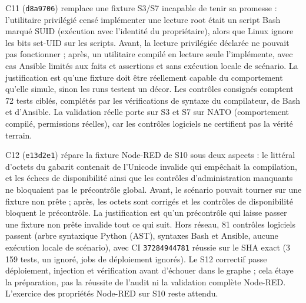 \documentclass[11pt,a4paper]{article}
\newcommand{\code}[1]{{\urlstyle{tt}\nolinkurl{#1}}}
\begin{document}
C11 (\code{d8a9706}) remplace une fixture S3/S7 incapable de tenir sa promesse : l'utilitaire privilégié censé implémenter une lecture root était un script Bash marqué SUID (exécution avec l'identité du propriétaire), alors que Linux ignore les bits set-UID sur les scripts. Avant, la lecture privilégiée déclarée ne pouvait pas fonctionner ; après, un utilitaire compilé en lecture seule l'implémente, avec cas Ansible limités aux faits et assertions et sans exécution locale de scénario. La justification est qu'une fixture doit être réellement capable du comportement qu'elle simule, sinon les runs testent un décor. Les contrôles consignés comptent 72 tests ciblés, complétés par les vérifications de syntaxe du compilateur, de Bash et d'Ansible. La validation réelle porte sur S3 et S7 sur NATO (comportement compilé, permissions réelles), car les contrôles logiciels ne certifient pas la vérité terrain.

C12 (\code{e13d2e1}) répare la fixture Node-RED de S10 sous deux aspects : le littéral d'octets du gabarit contenait de l'Unicode invalide qui empêchait la compilation, et les échecs de disponibilité ainsi que les contrôles d'administration manquants ne bloquaient pas le précontrôle global. Avant, le scénario pouvait tourner sur une fixture non prête ; après, les octets sont corrigés et les contrôles de disponibilité bloquent le précontrôle. La justification est qu'un précontrôle qui laisse passer une fixture non prête invalide tout ce qui suit. Hors réseau, 81 contrôles logiciels passent (arbre syntaxique Python (AST), syntaxes Bash et Ansible, aucune exécution locale de scénario), avec CI \code{37284944781} réussie sur le SHA exact (3\,159 tests, un ignoré, jobs de déploiement ignorés). Le S12 correctif passe déploiement, injection et vérification avant d'échouer dans le graphe ; cela étaye la préparation, pas la réussite de l'audit ni la validation complète Node-RED. L'exercice des propriétés Node-RED sur S10 reste attendu.
\end{document}
